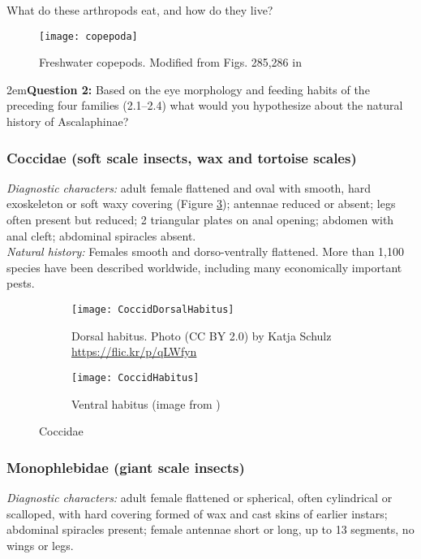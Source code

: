\noindent{}What do these arthropods eat, and how do they live?\vspace{2cm}

\begin{figure}[ht!]
  \centering
    \texttt{[image: copepoda]}
  \caption{Freshwater copepods. Modified from Figs. 285,286 in \cite{bhlitem155735cope}}
  \label{fig:copepod}
\end{figure}


\hangindent2em\textbf{Question 2:}  Based on the eye morphology and feeding habits of the preceding four families (2.1--2.4) what would you hypothesize about the natural history of Ascalaphinae?


\subsubsection{Coccidae (soft scale insects, wax and tortoise scales)}
\noindent{}\textit{Diagnostic characters:} adult female flattened and oval with smooth, hard exoskeleton or soft waxy covering (Figure \ref{fig:coccid2}); antennae reduced or absent; legs often present but reduced; 2 triangular plates on anal opening; abdomen with anal cleft; abdominal spiracles absent.\\

\noindent{}\textit{Natural history:} Females smooth and dorso-ventrally flattened. More than 1,100 species have been described worldwide, including many economically important pests.\\

\begin{figure}[ht!]
 \centering
 \begin{subfigure}[ht!]{0.45\textwidth}
  \texttt{[image: CoccidDorsalHabitus]}
  \caption{Dorsal habitus. Photo (CC BY 2.0) by Katja Schulz \url{https://flic.kr/p/qLWfyn}}
  \label{fig:coccid1}
 \end{subfigure}
 \qquad
 \begin{subfigure}[ht!]{0.45\textwidth}
  \texttt{[image: CoccidHabitus]}
  \caption{Ventral habitus (image from \cite{ScaleNet})}
  \label{fig:coccid2}
 \end{subfigure}
 \caption{Coccidae}\label{fig:coccid}
\end{figure}


\subsubsection{Monophlebidae (giant scale insects)}
\noindent{}\textit{Diagnostic characters:} adult female flattened or spherical, often cylindrical or scalloped, with hard covering formed of wax and cast skins of earlier instars; abdominal spiracles present; female antennae short or long, up to 13 segments, no wings or legs.\\

